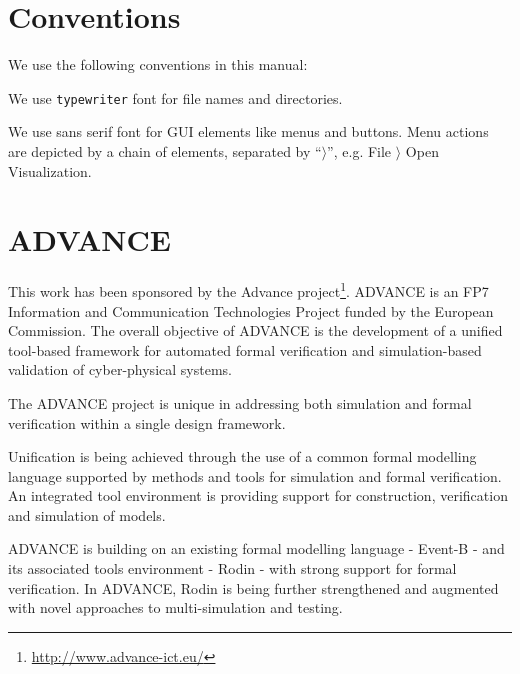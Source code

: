 \documentclass[twoside,10pt]{book}
\begin{document}
\section{Conventions}
\label{conventions}

We use the following conventions in this manual:


We use \texttt{typewriter} font for file names and directories.

We use \textsf{sans serif font} for GUI elements like menus and buttons.  Menu actions are depicted by a chain of elements, separated by ``$\rangle$'', e.g. \textsf{File $\rangle$ Open Visualization}.

\section{ADVANCE}
\label{advance}

This work has been sponsored by the Advance project\footnote{\url{http://www.advance-ict.eu/}}.  ADVANCE is an FP7 Information and Communication Technologies Project funded by the European Commission. The overall objective of ADVANCE is the development of a unified tool-based framework for automated formal verification and simulation-based validation of cyber-physical systems.

The ADVANCE project is unique in addressing both simulation and formal verification within a single design framework.

Unification is being achieved through the use of a common formal modelling language supported by methods and tools for simulation and formal verification. An integrated tool environment is providing support for construction, verification and simulation of models.

ADVANCE is building on an existing formal modelling language - Event-B - and its associated tools environment - Rodin - with strong support for formal verification. In ADVANCE, Rodin is being further strengthened and augmented with novel approaches to multi-simulation and testing.



% 
\end{document}
